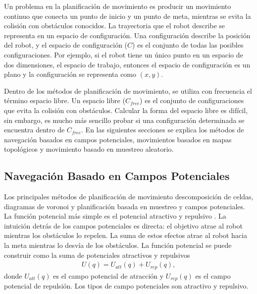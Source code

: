 Un problema en la planificación de movimiento es producir un movimiento 
continuo que conecta un punto de inicio y un punto de meta, mientras se evita 
la colisión con obstáculos conocidos. La trayectoria que el robot describe 
se representa en un espacio de configuración. Una configuración describe 
la posición del robot, y el espacio de configuración ($C$) es el conjunto 
de todas las posibles configuraciones. Por ejemplo, si el robot tiene 
un único punto en un espacio de dos dimensiones, el espacio de trabajo, entonces 
el espacio de configuración es un plano y la configuración se representa 
como $(x,y)$.

Dentro de los métodos de planificación de movimiento, se utiliza con 
frecuencia el término espacio libre. Un espacio libre ($C_{free}$) es el 
conjunto de configuraciones que evita la colisión con obstáculos. Calcular 
la forma del espacio libre es difícil, sin embargo, es mucho más sencillo 
probar si una configuración determinada se encuentra dentro de $C_{free}$. En 
las siguientes secciones se explica los métodos de navegación basados 
en campos potenciales, movimientos basados en mapas topológicos y 
movimiento basado en muestreo aleatorio.

\subsection{Navegación Basado en Campos Potenciales}
\label{sec:Campos Potenciales}
Los principales métodos de planificación de movimiento descomposición de celdas, diagramas de voronoi y planificación basada en muestreo y campos 
potenciales. La función potencial más simple es el potencial atractivo y repulsivo \cite{koren1991potential}. La intuición detrás de los campos potenciales es 
directa: el objetivo atrae al robot mientras los obstáculos lo repelen. La suma 
de estos efectos atrae al robot hacia la meta mientras lo desvía de los 
obstáculos. La función potencial se puede construir como la suma de potenciales 
atractivos y repulsivos
\begin{align}
\label{eqn:potetialField}
U(q) = U_{att}(q) + U_{rep}(q),
\end{align}
donde $U_{att}(q)$ es el campo potencial de atracción y $U_{rep}(q)$ es el campo
potencial de repulsión. Los tipos de campo potenciales son atractivo y repulsivo.

